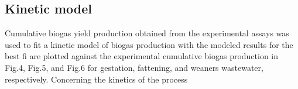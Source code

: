 \subsection{Kinetic model}
Cumulative biogas yield production obtained from the experimental assays was used to fit a kinetic model of biogas production with the modeled results for the best fi are plotted against the experimental cumulative biogas production in Fig.4, Fig.5, and Fig.6 for gestation, fattening, and weaners wastewater, respectively.
Concerning the kinetics of the process